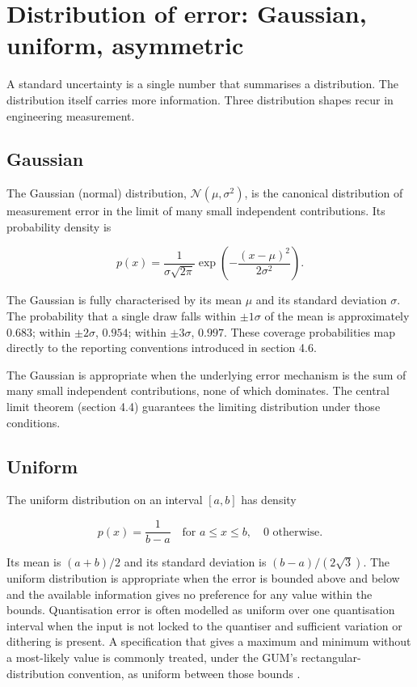 \section{Distribution of error: Gaussian, uniform, asymmetric}

A standard uncertainty is a single number that summarises a
distribution. The distribution itself carries more information.
Three distribution shapes recur in engineering measurement.

\subsection{Gaussian}

The Gaussian (normal) distribution, $\mathcal{N}(\mu, \sigma^{2})$,
is the canonical distribution of measurement error in the limit of
many small independent contributions. Its probability density is

\[
p(x) = \frac{1}{\sigma\sqrt{2\pi}} \exp\!\left(-\frac{(x - \mu)^{2}}
{2\sigma^{2}}\right).
\]

The Gaussian is fully characterised by its mean $\mu$ and its
standard deviation $\sigma$. The probability that a single draw
falls within $\pm 1\sigma$ of the mean is approximately $0.683$;
within $\pm 2\sigma$, $0.954$; within $\pm 3\sigma$, $0.997$. These
coverage probabilities map directly to the reporting conventions
introduced in section 4.6.

The Gaussian is appropriate when the underlying error mechanism is
the sum of many small independent contributions, none of which
dominates. The central limit theorem (section 4.4) guarantees the
limiting distribution under those conditions.

\subsection{Uniform}

The uniform distribution on an interval $[a, b]$ has density

\[
p(x) = \frac{1}{b - a} \quad \text{for } a \leq x \leq b, \quad 0
\text{ otherwise}.
\]

Its mean is $(a + b)/2$ and its standard deviation is
$(b - a)/(2\sqrt{3})$. The uniform distribution is appropriate when
the error is bounded above and below and the available information
gives no preference for any value within the bounds. Quantisation
error is often modelled as uniform over one quantisation interval
when the input is not locked to the quantiser and sufficient
variation or dithering is present. A specification that gives a
maximum and minimum without a most-likely value is commonly treated,
under the GUM's rectangular-distribution convention, as uniform
between those bounds \cite{std:iso-iec-guide98}.

